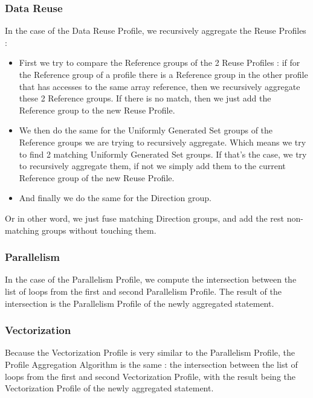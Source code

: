 \documentclass[paper=a4, fontsize=11.5pt]{scrartcl}
\numberwithin{equation}{section}        %
\numberwithin{figure}{section}          %
\numberwithin{table}{section}               %
\begin{document}
        \subsubsection{Data Reuse}
            In the case of the Data Reuse Profile, we recursively aggregate the Reuse Profiles :
            \begin{itemize}
                \item First we try to compare the Reference groups of the 2 Reuse Profiles :
                    if for the Reference group of a profile there is a Reference group in
                    the other profile that has accesses to the same array reference, then
                    we recursively aggregate these 2 Reference groups. If there is no
                    match, then we just add the Reference group to the new Reuse Profile.
                \item We then do the same for the Uniformly Generated Set groups of the
                    Reference groups we are trying to recursively aggregate. Which means we
                    try to find 2 matching Uniformly Generated Set groups.
                    If that's the case, we try to recursively aggregate them, if not we simply
                    add them to the current Reference group of the new Reuse Profile.
                \item And finally we do the same for the Direction group.
            \end{itemize}
            
            Or in other word, we just fuse matching Direction groups,
            and add the rest non-matching groups without touching them.
        \subsubsection{Parallelism}
            In the case of the Parallelism Profile, we compute the intersection between
            the list of loops from the first and second Parallelism Profile. The result
            of the intersection is the Parallelism Profile of the newly aggregated statement.
        \subsubsection{Vectorization}
            Because the Vectorization Profile is very similar to the Parallelism Profile, 
            the Profile Aggregation Algorithm is the same : the intersection between the
            list of loops from the first and second Vectorization Profile, with the result
            being the Vectorization Profile of the newly aggregated statement.
\end{document}

